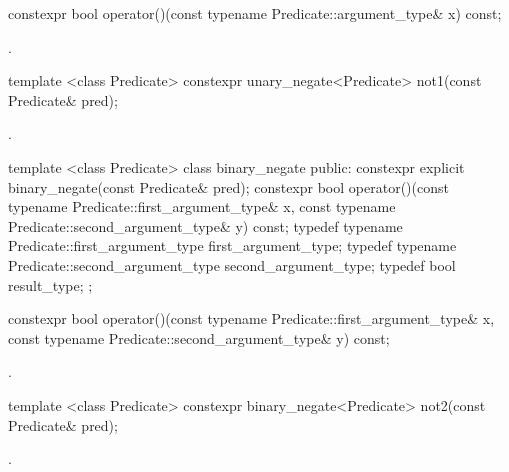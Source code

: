%
\begin{itemdecl}
constexpr bool operator()(const typename Predicate::argument_type& x) const;
\end{itemdecl}

\begin{itemdescr}
\pnum \returns {}.
\end{itemdescr}

%
\begin{itemdecl}
template <class Predicate>
   constexpr unary_negate<Predicate> not1(const Predicate& pred);
\end{itemdecl}

\begin{itemdescr}
\pnum \returns {}.
\end{itemdescr}

%
\begin{codeblock}
template <class Predicate>
class binary_negate {
public:
  constexpr explicit binary_negate(const Predicate& pred);
  constexpr bool operator()(const typename Predicate::first_argument_type& x,
                            const typename Predicate::second_argument_type& y) const;
  typedef typename Predicate::first_argument_type first_argument_type;
  typedef typename Predicate::second_argument_type second_argument_type;
  typedef bool result_type;
};
\end{codeblock}

%
\begin{itemdecl}
constexpr bool operator()(const typename Predicate::first_argument_type& x,
                          const typename Predicate::second_argument_type& y) const;
\end{itemdecl}

\begin{itemdescr}
\pnum \returns {}.
\end{itemdescr}

%
\begin{itemdecl}
template <class Predicate>
  constexpr binary_negate<Predicate> not2(const Predicate& pred);
\end{itemdecl}

\begin{itemdescr}
\pnum \returns {}.
\end{itemdescr}
